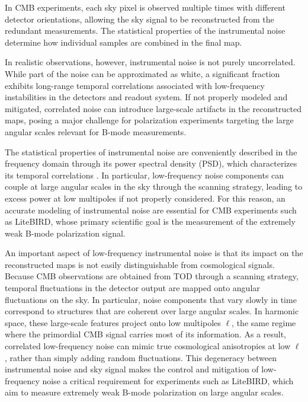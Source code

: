 In CMB experiments, each sky pixel is observed multiple times with different detector orientations, allowing the sky signal to be reconstructed from the redundant measurements. The statistical properties of the instrumental noise determine how individual samples are combined in the final map.

In realistic observations, however, instrumental noise is not purely uncorrelated. While part of the noise can be approximated as white, a significant fraction exhibits long-range temporal correlations associated with low-frequency instabilities in the detectors and readout system. If not properly modeled and mitigated, correlated noise can introduce large-scale artifacts in the reconstructed maps, posing a major challenge for polarization experiments targeting the large angular scales relevant for B-mode measurements.

The statistical properties of instrumental noise are conveniently described in the frequency domain through its power spectral density (PSD), which characterizes its temporal correlations \cite{Ashdown2007}. In particular, low-frequency noise components can couple at large angular scales in the sky through the scanning strategy, leading to excess power at low multipoles if not properly considered. For this reason, an accurate modeling of instrumental noise are essential for CMB experiments such as LiteBIRD, whose primary scientific goal is the measurement of the extremely weak B-mode polarization signal.

An important aspect of low-frequency instrumental noise is that its impact on the reconstructed maps is not easily distinguishable from cosmological signals. Because CMB observations are obtained from TOD through a scanning strategy, temporal fluctuations in the detector output are mapped onto angular fluctuations on the sky. In particular, noise components that vary slowly in time correspond to structures that are coherent over large angular scales. In harmonic space, these large-scale features project onto low multipoles $\ell$, the same regime where the primordial CMB signal carries most of its information. As a result, correlated low-frequency noise can mimic true cosmological anisotropies at low $\ell$, rather than simply adding random fluctuations. This degeneracy between instrumental noise and sky signal makes the control and mitigation of low-frequency noise a critical requirement for experiments such as LiteBIRD, which aim to measure extremely weak B-mode polarization on large angular scales.




